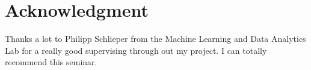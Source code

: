 \documentclass[journal]{IEEEtran}
\begin{document}
\section*{Acknowledgment}
\noindent Thanks a lot to Philipp Schlieper from the Machine Learning and Data Analytics Lab for a really good supervising through out my project. I can totally recommend this seminar.




%




\end{document}
